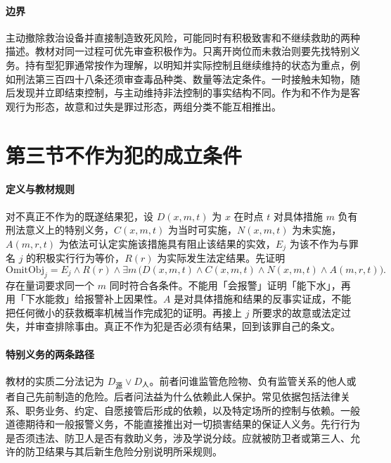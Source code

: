 \paragraph{边界}
主动撤除救治设备并直接制造致死风险，可能同时有积极致害和不继续救助的两种描述。教材对同一过程可优先审查积极作为。只离开岗位而未救治则要先找特别义务。持有型犯罪通常按作为理解，以明知并实际控制且继续维持的状态为重点，例如刑法第三百四十八条还须审查毒品种类、数量等法定条件。一时接触未知物，随后发现并立即结束控制，与主动维持非法控制的事实结构不同。作为和不作为是客观行为形态，故意和过失是罪过形态，两组分类不能互相推出。

\section{第三节\quad 不作为犯的成立条件}

\paragraph{定义与教材规则}
对不真正不作为的既遂结果犯，设 $D(x,m,t)$ 为 $x$ 在时点 $t$ 对具体措施 $m$ 负有刑法意义上的特别义务，$C(x,m,t)$ 为当时可实施，$N(x,m,t)$ 为未实施，$A(m,r,t)$ 为依法可认定实施该措施具有阻止该结果的实效，$E_j$ 为该不作为与罪名 $j$ 的积极实行行为等价，$R(r)$ 为实际发生法定结果。先证明
\[
\mathrm{OmitObj}_j
 = E_j\land R(r)\land
   \exists m\,\bigl(D(x,m,t)\land C(x,m,t)\land
                  N(x,m,t)\land A(m,r,t)\bigr).
\]
存在量词要求同一个 $m$ 同时符合各条件。不能用「会报警」证明「能下水」，再用「下水能救」给报警补上因果性。$A$ 是对具体措施和结果的反事实证成，不能把任何微小的获救概率机械当作完成犯的证明。再接上 $j$ 所要求的故意或法定过失，并审查排除事由。真正不作为犯是否必须有结果，回到该罪自己的条文。

\paragraph{特别义务的两条路径}
教材的实质二分法记为 $D_{\text{源}}\lor D_{\text{人}}$。前者问谁监管危险物、负有监管关系的他人或者自己先前制造的危险。后者问法益为什么依赖此人保护。常见依据包括法律关系、职务业务、约定、自愿接管后形成的依赖，以及特定场所的控制与依赖。一般道德期待和一般报警义务，不能直接推出对一切损害结果的保证人义务。先行行为是否须违法、防卫人是否有救助义务，涉及学说分歧。应就被防卫者或第三人、允许的防卫结果与其后新生危险分别说明所采规则。


